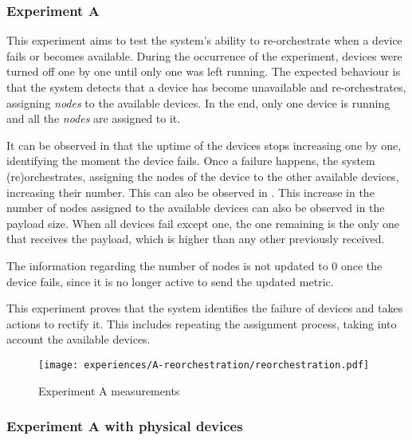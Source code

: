
\subsubsection{Experiment A}\label{sec:exp_a}

This experiment aims to test the system's ability to re-orchestrate when a device fails or becomes available. During the occurrence of the experiment, devices were turned off one by one until only one was left running. The expected behaviour is that the system detects that a device has become unavailable and re-orchestrates, assigning \textit{nodes} to the available devices. In the end, only one device is running and all the \textit{nodes} are assigned to it.

It can be observed in  that the uptime of the devices stops increasing one by one, identifying the moment the device fails. Once a failure happens, the system (re)orchestrates, assigning the nodes of the device to the other available devices, increasing their number. This can also be observed in . This increase in the number of nodes assigned to the available devices can also be observed in the payload size. When all devices fail except one, the one remaining is the only one that receives the payload, which is higher than any other previously received.

The information regarding the number of nodes is not updated to 0 once the device fails, since it is no longer active to send the updated metric. 

This experiment proves that the system identifies the failure of devices and takes actions to rectify it. This includes repeating the assignment process, taking into account the available devices.

\begin{figure}[h]
\centering
\texttt{[image: experiences/A-reorchestration/reorchestration.pdf]}
\caption[Experiment A measurements]{Experiment A measurements}\label{fig:experiment_a_graph}
\end{figure}


\subsubsection{Experiment A with physical devices}

